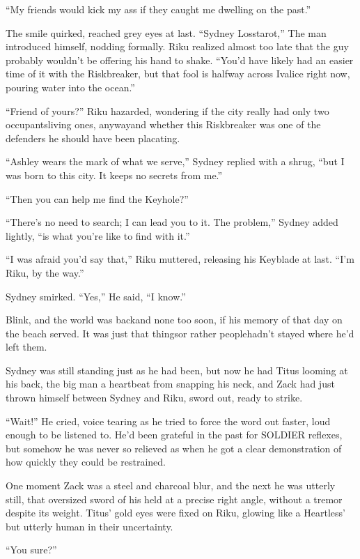 ``My friends would kick my ass if they caught me dwelling on the past.''

The smile quirked, reached grey eyes at last. ``Sydney Losstarot,'' The man introduced himself, nodding formally. Riku realized almost too late that the guy probably wouldn't be offering his hand to shake. ``You'd have likely had an easier time of it with the Riskbreaker, but that fool is halfway across Ivalice right now, pouring water into the ocean.''

``Friend of yours?'' Riku hazarded, wondering if the city really had only two occupants\textemdash living ones, anyway\textemdash and whether this Riskbreaker was one of the defenders he should have been placating.

``Ashley wears the mark of what we serve,'' Sydney replied with a shrug, ``but I was born to this city. It keeps no secrets from me.''

``Then you can help me find the Keyhole?''

``There's no need to search; I can lead you to it. The problem,'' Sydney added lightly, ``is what you're like to find with it.''

``I was afraid you'd say that,'' Riku muttered, releasing his Keyblade at last. ``I'm Riku, by the way.''

Sydney smirked. ``Yes,'' He said, ``I know.''

Blink, and the world was back\textemdash and none too soon, if his memory of that day on the beach served. It was just that things\textemdash or rather people\textemdash hadn't stayed where he'd left them.

Sydney was still standing just as he had been, but now he had Titus looming at his back, the big man a heartbeat from snapping his neck, and Zack had just thrown himself between Sydney and Riku, sword out, ready to strike.

``Wait!'' He cried, voice tearing as he tried to force the word out faster, loud enough to be listened to. He'd been grateful in the past for SOLDIER reflexes, but somehow he was never so relieved as when he got a clear demonstration of how quickly they could be restrained.

One moment Zack was a steel and charcoal blur, and the next he was utterly still, that oversized sword of his held at a precise right angle, without a tremor despite its weight. Titus' gold eyes were fixed on Riku, glowing like a Heartless' but utterly human in their uncertainty.

``You sure?''

